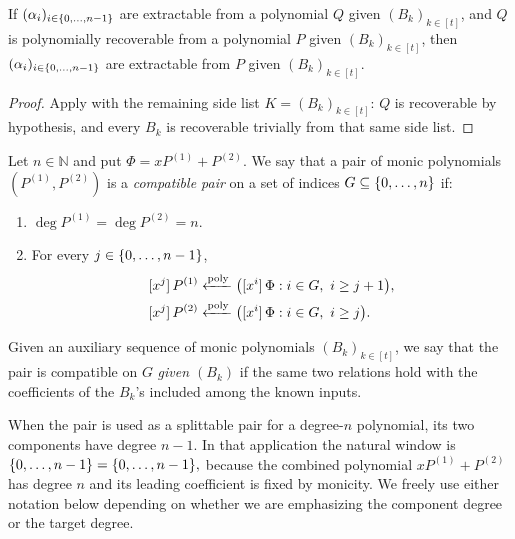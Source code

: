 \begin{corollary}\label{lem:extractable-via-derivable}
    If $(\alpha_i)_{i\in\{0,\dotsc,n-1\}}$ are extractable from a polynomial $Q$ given
    $(B_k)_{k\in[t]}$, and $Q$ is polynomially recoverable from a polynomial
    $P$ given $(B_k)_{k\in[t]}$, then $(\alpha_i)_{i\in\{0,\dotsc,n-1\}}$ are
    extractable from $P$ given $(B_k)_{k\in[t]}$.
\end{corollary}
\begin{proof}
    Apply  with the remaining side list
    $K=(B_k)_{k\in[t]}$: $Q$ is recoverable by hypothesis, and every $B_k$
    is recoverable trivially from that same side list.
\end{proof}

\begin{definition}\label{def:compatible-pair}
    Let $n\in\mathbb{N}$ and put $\Phi=xP^{(1)}+P^{(2)}$.  We say that a
    pair of monic polynomials $(P^{(1)},P^{(2)})$ is a \emph{compatible pair}
    on a set of indices $G\subseteq\{0,\dotsc,n\}$ if:
    \begin{enumerate}
        \item $\deg P^{(1)} = \deg P^{(2)} = n$.
        \item For every $j\in\{0,\dotsc,n-1\}$,
        \begin{align}
            \coeff{P^{(1)}}{j}
              &\polyfrom
              \bigl(\coeff{\Phi}{i}:i\in G,\ i\ge j+1\bigr),\\
            \coeff{P^{(2)}}{j}
              &\polyfrom
              \bigl(\coeff{\Phi}{i}:i\in G,\ i\ge j\bigr).
        \end{align}
    \end{enumerate}

    Given an auxiliary sequence of monic polynomials $(B_k)_{k\in[t]}$, we
    say that the pair is compatible on $G$ \emph{given $(B_k)$} if the same
    two relations hold with the coefficients of the $B_k$'s included among
    the known inputs.
\end{definition}

When the pair is used as a splittable pair for a degree-$n$ polynomial, its
two components have degree $n-1$.  In that application the natural window is
\(
  \{0,\dotsc,n-1\}=\{0,\dotsc,n-1\},
\)
because the combined polynomial \(xP^{(1)}+P^{(2)}\) has degree \(n\) and its
leading coefficient is fixed by monicity.  We freely use either notation below
depending on whether we are emphasizing the component degree or the target
degree.


